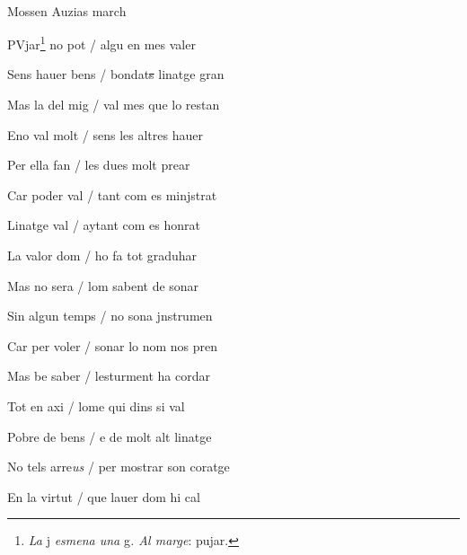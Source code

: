 \documentclass[12pt]{article}
\renewcommand{\espaiAbansEtiquetaPoema}{\vspace{0ex}}
\begin{document}
\begin{estrofa}

\espaiAbansEtiquetaPoema

\\

\begin{rubrica}

Mossen Auzias march

\end{rubrica}

\end{estrofa}


\begin{estrofa}

 PVjar\footnote{\textit{La} j\textit{ esmena una }g\textit{. Al marge}: pujar.}
no pot / algu en mes valer

 Sens hauer bens / bondat\sout{s} linatge gran

 Mas la del mig / val mes que lo restan

 Eno val molt / sens les altres hauer

 Per ella fan / les dues molt prear

 Car poder val / tant com es minjstrat

 Linatge val / aytant com es honrat

 La valor dom / ho fa tot graduhar

\end{estrofa}



\begin{estrofa}

 Mas no sera / lom sabent de sonar

 Sin algun temps / no sona jnstrumen

 Car per voler / sonar lo nom nos pren

 Mas be saber / lesturment ha cordar

 Tot en axi / lome qui dins si val

 Pobre de bens / e de molt alt linatge

 No tels arre\textit{us} / per mostrar son coratge

 En la virtut / que lauer dom hi cal

\end{estrofa}
\end{document}
